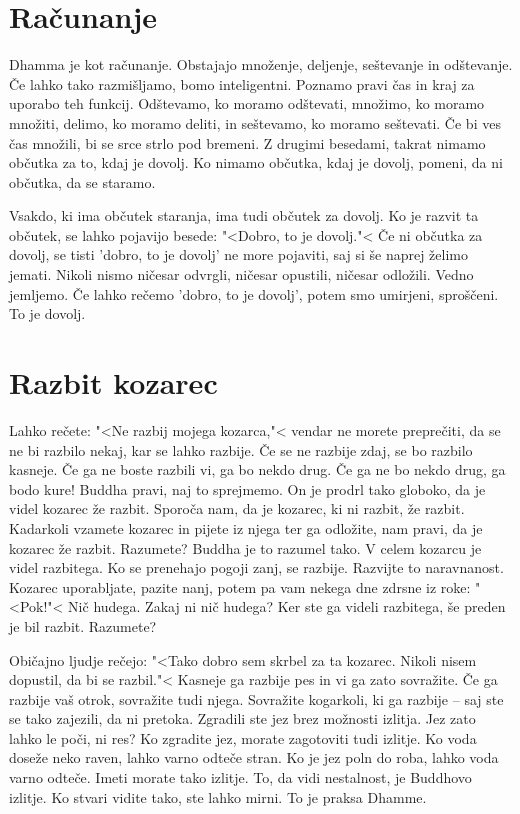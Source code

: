 \section{Računanje}

Dhamma je kot računanje. Obstajajo množenje, deljenje, seštevanje in odštevanje. Če lahko tako razmišljamo, bomo inteligentni. Poznamo pravi čas in kraj za uporabo teh funkcij. Odštevamo, ko moramo odštevati, množimo, ko moramo množiti, delimo, ko moramo deliti, in seštevamo, ko moramo seštevati. Če bi ves čas množili, bi se srce strlo pod bremeni. Z drugimi besedami, takrat nimamo občutka za to, kdaj je dovolj. Ko nimamo občutka, kdaj je dovolj, pomeni, da ni občutka, da se staramo. 

Vsakdo, ki ima občutek staranja, ima tudi občutek za dovolj. Ko je razvit ta občutek, se lahko pojavijo besede: "<Dobro, to je dovolj."< Če ni občutka za dovolj, se tisti 'dobro, to je dovolj' ne more pojaviti, saj si še naprej želimo jemati. Nikoli nismo ničesar odvrgli, ničesar opustili, ničesar odložili. Vedno jemljemo. Če lahko rečemo 'dobro, to je dovolj', potem smo umirjeni, sproščeni. To je dovolj.

\section{Razbit kozarec}

Lahko rečete: "<Ne razbij mojega kozarca,"< vendar ne morete preprečiti, da se ne bi razbilo nekaj, kar se lahko razbije. Če se ne razbije zdaj, se bo razbilo kasneje. Če ga ne boste razbili vi, ga bo nekdo drug. Če ga ne bo nekdo drug, ga bodo kure! Buddha pravi, naj to sprejmemo. On je prodrl tako globoko, da je videl kozarec že razbit. Sporoča nam, da je kozarec, ki ni razbit, že razbit. Kadarkoli vzamete kozarec in pijete iz njega ter ga odložite, nam pravi, da je kozarec že razbit. Razumete? Buddha je to razumel tako. V celem kozarcu je videl razbitega. Ko se prenehajo pogoji zanj, se razbije. Razvijte to naravnanost. Kozarec uporabljate, pazite nanj, potem pa vam nekega dne zdrsne iz roke: "<Pok!"< Nič hudega. Zakaj ni nič hudega? Ker ste ga videli razbitega, še preden je bil razbit. Razumete?

Običajno ljudje rečejo: "<Tako dobro sem skrbel za ta kozarec. Nikoli nisem dopustil, da bi se razbil."< Kasneje ga razbije pes in vi ga zato sovražite. Če ga razbije vaš otrok, sovražite tudi njega. Sovražite kogarkoli, ki ga razbije – saj ste se tako zajezili, da ni pretoka. Zgradili ste jez brez možnosti izlitja. Jez zato lahko le poči, ni res? Ko zgradite jez, morate zagotoviti tudi izlitje. Ko voda doseže neko raven, lahko varno odteče stran. Ko je jez poln do roba, lahko voda varno odteče. Imeti morate tako izlitje. To, da vidi nestalnost, je Buddhovo izlitje. Ko stvari vidite tako, ste lahko mirni. To je praksa Dhamme.

